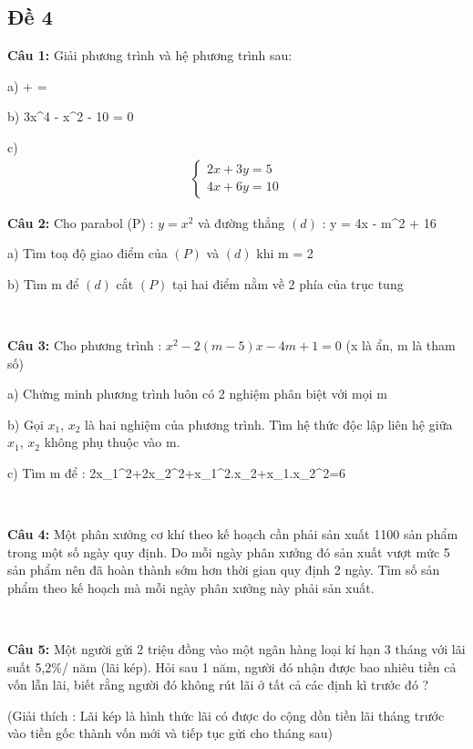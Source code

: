 \documentclass[12pt]{article}
\begin{document}
\break

\subsection{Đề 4}

\textbf{Câu 1:} Giải phương trình và hệ phương trình sau:\par
a)  +  =  \par
b) 3x^4 - x^2 - 10 = 0 \par
c)
\begin{align}
        \begin{cases}
        2x + 3y = 5 \\
        4x + 6y = 10
        \end{cases}
\end{align}

\textbf{Câu 2:} Cho parabol (P) : $y = x^2$ và đường thẳng $(d)$ : y = 4x - m^2 + 16 \par
a) Tìm toạ độ giao điểm của $(P)$ và $(d)$ khi m = 2 \par
b) Tìm m để $(d)$ cắt $(P)$ tại hai điểm nằm về 2 phía của trục tung

\

\textbf{Câu 3:} Cho phương trình : $x^2-2(m-5)x-4m+1=0$ (x là ẩn, m là tham số) \par
a) Chứng minh phương trình luôn có 2 nghiệm phân biệt với mọi m \par
b) Gọi $x_1$, $x_2$ là hai nghiệm của phương trình. Tìm hệ thức độc lập liên hệ giữa $x_1$, $x_2$ không phụ thuộc vào m. \par
c) Tìm m để : 2x_1^2+2x_2^2+x_1^2.x_2+x_1.x_2^2=6

\

\textbf{Câu 4:} Một phân xưởng cơ khí theo kế hoạch cần phải sản xuất 1100 sản phẩm trong một số ngày quy định. Do mỗi ngày phân xưởng đó sản xuất vượt mức 5 sản phẩm nên đã hoàn thành sớm hơn thời gian quy định 2 ngày. Tìm số sản phẩm theo kế hoạch mà mỗi ngày phân xưởng này phải sản xuất.

\

\textbf{Câu 5:} Một người gửi 2 triệu đồng vào một ngân hàng loại kí hạn 3 tháng với lãi suất 5,2\%/ năm (lãi kép). Hỏi sau 1 năm, người đó nhận được bao nhiêu tiền cả vốn lẫn lãi, biết rằng người đó không rút lãi ở tất cả các định kì trước đó ? \par
(Giải thích : Lãi kép là hình thức lãi có được do cộng dồn tiền lãi tháng trước vào tiền gốc thành vốn mới và tiếp tục gửi cho tháng sau) \par
\end{document}
